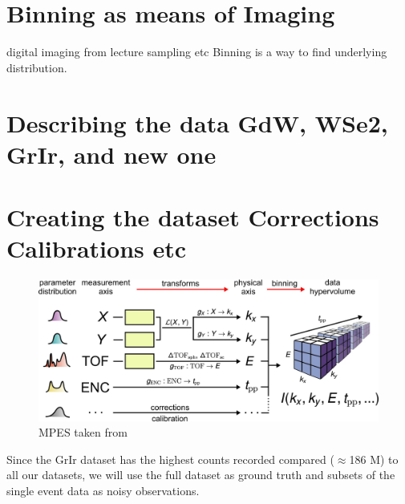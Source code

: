 \section{Binning as means of Imaging}
digital imaging from lecture
sampling etc
Binning is a way to find underlying distribution.


\section{Describing the data GdW, WSe2, GrIr, and new one}

\section{Creating the dataset Corrections Calibrations etc}\label{section:datasets}
\begin{figure}
    \centering
    \includegraphics[width=1\linewidth]{images/2024-08-25-22-36-44.png}
    \caption{MPES taken from \cite{xianOpensourceEndtoendWorkflow2020}}
\end{figure}


Since the \gls{GrIr} dataset has the highest counts recorded compared ($\approx$186 M) to all our datasets, we will use the full dataset as ground truth and subsets of the single event data as noisy observations.